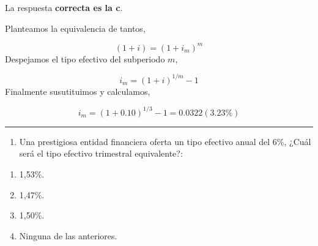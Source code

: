 \documentclass[
  letterpaper,
  DIV=11,
  numbers=noendperiod]{scrreprt}
\providecommand{\tightlist}{%
  \setlength{\itemsep}{0pt}\setlength{\parskip}{0pt}}\usepackage{longtable,booktabs,array}
\begin{document}
\begin{tcolorbox}[enhanced jigsaw, left=2mm, opacityback=0, colback=white, breakable, arc=.35mm, bottomrule=.15mm, rightrule=.15mm, toprule=.15mm, leftrule=.75mm, colframe=quarto-callout-tip-color-frame]
\begin{minipage}[t]{5.5mm}
\textcolor{quarto-callout-tip-color}{\faLightbulb}
\end{minipage}%
\begin{minipage}[t]{\textwidth - 5.5mm}

La respuesta \textbf{correcta es la c}.

Planteamos la equivalencia de tantos,

\[\left(1+i\right)=\left(1+i_m\right)^m\] Despejamos el tipo efectivo
del subperiodo \(m\),

\[i_m=\left(1+i\right)^{1/m}-1\] Finalmente susutituimos y calculamos,

\[i_m=\left(1+0.10\right)^{1/3}-1=0.0322(3.23\%)\]

\end{minipage}%
\end{tcolorbox}

\begin{center}\rule{0.5\linewidth}{0.5pt}\end{center}

\begin{enumerate}
\def\labelenumi{\arabic{enumi}.}
\setcounter{enumi}{22}
\tightlist
\item
  Una prestigiosa entidad financiera oferta un tipo efectivo anual del
  6\%, ¿Cuál será el tipo efectivo trimestral equivalente?:
\end{enumerate}

\begin{enumerate}
\def\labelenumi{\alph{enumi})}
\item
  1,53\%.
\item
  1,47\%.
\item
  1,50\%.
\item
  Ninguna de las anteriores.
\end{enumerate}
\end{document}
